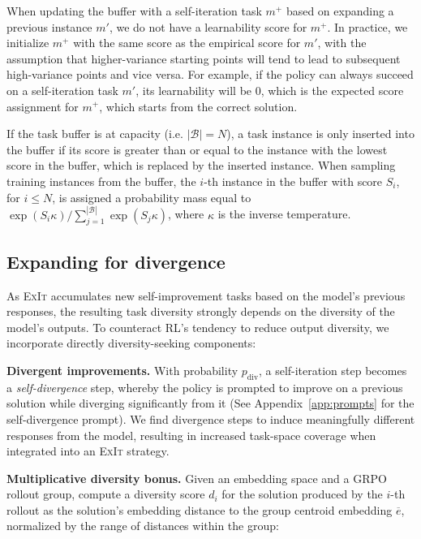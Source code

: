 \documentclass[10pt]{article} %
\newcommand{\methodname}{\textsc{ExIt}}
\begin{document}
When updating the buffer with a self-iteration task $m^+$ based on expanding a previous instance $m'$, we do not have a learnability score for $m^+$. In practice, we initialize $m^+$ with the same score as the empirical score for $m'$, with the assumption that higher-variance starting points will tend to lead to subsequent high-variance points and vice versa. For example, if the policy can always succeed on a self-iteration task $m'$, its learnability will be 0, which is the expected score assignment for $m^+$, which starts from the correct solution. 

If the task buffer is at capacity (i.e. $|\mathcal{B}| = N$), a task instance is only inserted into the buffer if its score is greater than or equal to the instance with the lowest score in the buffer, which is replaced by the inserted instance. When sampling training instances from the buffer, the $i$-th instance in the buffer with score $S_i$, for $i \leq N$, is assigned a probability mass equal to $\exp (S_i\kappa ) / \sum_{j=1}^{|\mathcal{B}|}\exp (S_j\kappa)$, where $\kappa$ is the inverse temperature. 


\subsection{Expanding for divergence}
\label{sec:expansion}

As \methodname{} accumulates new self-improvement tasks based on the model's previous responses, the resulting task diversity strongly depends on the diversity of the model's outputs. To counteract RL's tendency to reduce output diversity, we incorporate directly diversity-seeking components:

\textbf{Divergent improvements.} With probability $p_\text{div}$, a self-iteration step becomes a \emph{self-divergence} step, whereby the policy is prompted to improve on a previous solution while diverging significantly from it (See Appendix~\ref{app:prompts} for the self-divergence prompt). We find divergence steps to induce meaningfully different responses from the model, resulting in increased task-space coverage when integrated into an \methodname{} strategy. 

\textbf{Multiplicative diversity bonus.} Given an embedding space and a GRPO rollout group, compute a diversity score $d_i$ for the solution produced by the $i$-th rollout as the solution's embedding distance to the group centroid embedding $\overline{e}$, normalized by the range of distances within the group:
\end{document}
